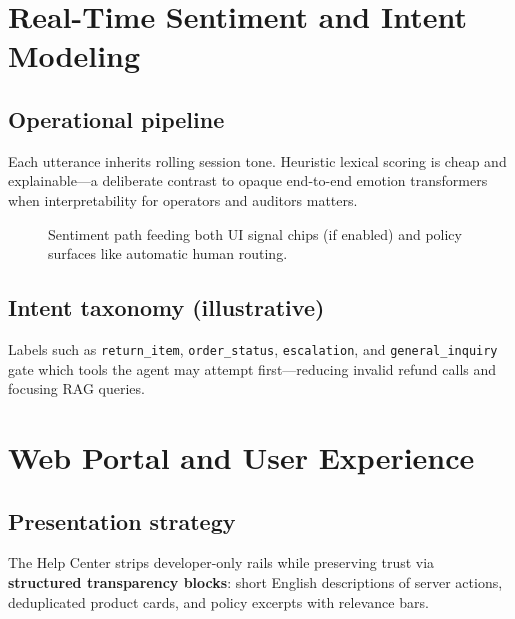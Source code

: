 \documentclass[11pt,a4paper,twoside]{report}
\begin{document}
\chapter{Real-Time Sentiment and Intent Modeling}

\section{Operational pipeline}
Each utterance inherits rolling session tone.
Heuristic lexical scoring is cheap and explainable—a deliberate contrast to opaque end-to-end emotion transformers when interpretability for operators and auditors matters.

\begin{figure}[htbp]
\centering
{}
\caption{Sentiment path feeding both UI signal chips (if enabled) and policy surfaces like automatic human routing.}
\label{fig:sentiment-stack}
\end{figure}

\section{Intent taxonomy (illustrative)}
Labels such as \texttt{return\_item}, \texttt{order\_status}, \texttt{escalation}, and \texttt{general\_inquiry} gate which tools the agent may attempt first—reducing invalid refund calls and focusing RAG queries.

\chapter{Web Portal and User Experience}

\section{Presentation strategy}
The Help Center strips developer-only rails while preserving trust via \textbf{structured transparency blocks}: short English descriptions of server actions, deduplicated product cards, and policy excerpts with relevance bars.
\end{document}
